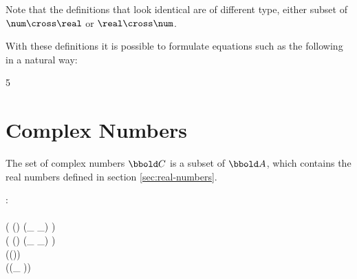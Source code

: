 \documentclass[12pt]{article}
\begin{document}
{}
Note that the definitions that look identical are of different type,
either subset of $\num \cross \real$ or $\real \cross \num$.

With these definitions it is possible to formulate equations such as
the following in a natural way:
\begin{zed}
  5 \azlta \aten {}
\end{zed}

\section{Complex Numbers}
\label{sec:complex-numbers}
The set of complex numbers $\complex$ is a subset of $\arithmos$,
which contains the real numbers defined in section
\ref{sec:real-numbers}.
%
\begin{axdef}
  \complex : \power \arithmos\\
  \where
  \real \subset \complex \\
  \ran ( (\complex \cross \complex) \dres (\_ \aplus \_) ) \subset \complex\\
  \ran ( (\complex \cross \complex) \dres (\_ \amult \_) ) \subset \complex\\
  \ran (\complex \dres (\aneg ))  \subset \complex\\
  \ran (\complex \dres (\_ \ainv ))  \subset \complex\\
\end{axdef}
\end{document}
